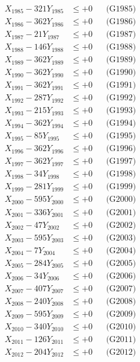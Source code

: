\documentclass[a4paper,10pt]{article}
\begin{document}
{\begin{align}
X_{1985} - 321Y_{1985} &\leq +0 && \text{(G1985)} \\
X_{1986} - 362Y_{1986} &\leq +0 && \text{(G1986)} \\
X_{1987} - 21Y_{1987} &\leq +0 && \text{(G1987)} \\
X_{1988} - 146Y_{1988} &\leq +0 && \text{(G1988)} \\
X_{1989} - 362Y_{1989} &\leq +0 && \text{(G1989)} \\
X_{1990} - 362Y_{1990} &\leq +0 && \text{(G1990)} \\
\allowbreak
X_{1991} - 362Y_{1991} &\leq +0 && \text{(G1991)} \\
X_{1992} - 287Y_{1992} &\leq +0 && \text{(G1992)} \\
X_{1993} - 215Y_{1993} &\leq +0 && \text{(G1993)} \\
X_{1994} - 362Y_{1994} &\leq +0 && \text{(G1994)} \\
X_{1995} - 85Y_{1995} &\leq +0 && \text{(G1995)} \\
X_{1996} - 362Y_{1996} &\leq +0 && \text{(G1996)} \\
X_{1997} - 362Y_{1997} &\leq +0 && \text{(G1997)} \\
X_{1998} - 34Y_{1998} &\leq +0 && \text{(G1998)} \\
X_{1999} - 281Y_{1999} &\leq +0 && \text{(G1999)} \\
X_{2000} - 595Y_{2000} &\leq +0 && \text{(G2000)} \\
\allowbreak
X_{2001} - 336Y_{2001} &\leq +0 && \text{(G2001)} \\
X_{2002} - 47Y_{2002} &\leq +0 && \text{(G2002)} \\
X_{2003} - 595Y_{2003} &\leq +0 && \text{(G2003)} \\
X_{2004} - 7Y_{2004} &\leq +0 && \text{(G2004)} \\
X_{2005} - 284Y_{2005} &\leq +0 && \text{(G2005)} \\
X_{2006} - 34Y_{2006} &\leq +0 && \text{(G2006)} \\
X_{2007} - 407Y_{2007} &\leq +0 && \text{(G2007)} \\
X_{2008} - 240Y_{2008} &\leq +0 && \text{(G2008)} \\
X_{2009} - 595Y_{2009} &\leq +0 && \text{(G2009)} \\
X_{2010} - 340Y_{2010} &\leq +0 && \text{(G2010)} \\
\allowbreak
X_{2011} - 126Y_{2011} &\leq +0 && \text{(G2011)} \\
X_{2012} - 204Y_{2012} &\leq +0 && \text{(G2012)} \\

\end{align}}
\end{document}
